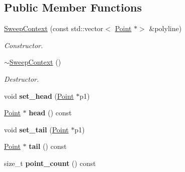 \subsection*{Public Member Functions}
\begin{DoxyCompactItemize}
\item 
\mbox{\label{classp2t_1_1SweepContext_a0e9d5ab3f563e9411c57a81d6f5fa784}} 
\hyperlink{classp2t_1_1SweepContext_a0e9d5ab3f563e9411c57a81d6f5fa784}{Sweep\+Context} (const std\+::vector$<$ \hyperlink{structp2t_1_1Point}{Point} $\ast$$>$ \&polyline)
\begin{DoxyCompactList}\small\item\em Constructor. \end{DoxyCompactList}\item 
\mbox{\label{classp2t_1_1SweepContext_a4275f1eb166fe4c69d18670898c65f98}} 
\hyperlink{classp2t_1_1SweepContext_a4275f1eb166fe4c69d18670898c65f98}{$\sim$\+Sweep\+Context} ()
\begin{DoxyCompactList}\small\item\em Destructor. \end{DoxyCompactList}\item 
\mbox{\label{classp2t_1_1SweepContext_abd31ac7cc3ba9d418e08d5583ae7d32e}} 
void {\bfseries set\+\_\+head} (\hyperlink{structp2t_1_1Point}{Point} $\ast$p1)
\item 
\mbox{\label{classp2t_1_1SweepContext_a6200a1306eb5ddb4f41fc44ad7da568d}} 
\hyperlink{structp2t_1_1Point}{Point} $\ast$ {\bfseries head} () const
\item 
\mbox{\label{classp2t_1_1SweepContext_ac685ab377d5f1b184b4bb94e151a2af9}} 
void {\bfseries set\+\_\+tail} (\hyperlink{structp2t_1_1Point}{Point} $\ast$p1)
\item 
\mbox{\label{classp2t_1_1SweepContext_a638a5e0fa56ceed1a701480dfbe971c0}} 
\hyperlink{structp2t_1_1Point}{Point} $\ast$ {\bfseries tail} () const
\item 
\mbox{\label{classp2t_1_1SweepContext_a8b15732d7078f336d0017475c422c15a}} 
size\+\_\+t {\bfseries point\+\_\+count} () const
$$
\end{DoxyCompactItemize}
